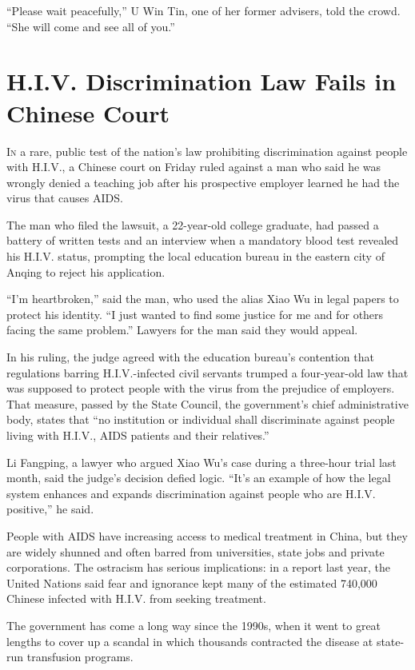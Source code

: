 ﻿\documentclass[12pt]{article}
\begin{document}
``Please wait peacefully,'' U Win Tin, one of her former advisers, told the crowd. ``She will come
and see all of you.''

\section{H.I.V. Discrimination Law Fails in Chinese Court}

\lettrine{I}{n} a rare, public test of the nation's law prohibiting
discrimination against people with H.I.V., a Chinese court on Friday ruled against a man who said he
was wrongly denied a teaching job after his prospective employer learned he had the virus that
causes AIDS.

The man who filed the lawsuit, a 22-year-old college graduate, had passed a battery of written tests
and an interview when a mandatory blood test revealed his H.I.V. status, prompting the local
education bureau in the eastern city of Anqing to reject his application.

``I'm heartbroken,'' said the man, who used the alias Xiao Wu in legal papers to protect his
identity. ``I just wanted to find some justice for me and for others facing the same problem.''
Lawyers for the man said they would appeal.

In his ruling, the judge agreed with the education bureau's contention that regulations barring
H.I.V.-infected civil servants trumped a four-year-old law that was supposed to protect people with
the virus from the prejudice of employers. That measure, passed by the State Council, the
government's chief administrative body, states that ``no institution or individual shall
discriminate against people living with H.I.V., AIDS patients and their relatives.''

Li Fangping, a lawyer who argued Xiao Wu's case during a three-hour trial last month, said the
judge's decision defied logic. ``It's an example of how the legal system enhances and expands
discrimination against people who are H.I.V. positive,'' he said.

People with AIDS have increasing access to medical treatment in China, but they are widely shunned
and often barred from universities, state jobs and private corporations. The ostracism has serious
implications: in a report last year, the United Nations said fear and ignorance kept many of the
estimated 740,000 Chinese infected with H.I.V. from seeking treatment.

The government has come a long way since the 1990s, when it went to great lengths to cover up a
scandal in which thousands contracted the disease at state-run transfusion programs.
\end{document}
